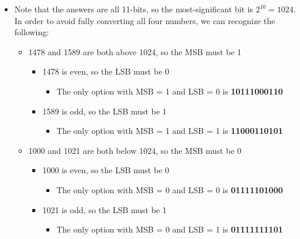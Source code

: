 \begin{itemize}
  \item Note that the answers are all 11-bits, so the most-significant bit is $2^{10} = 1024$. In order to avoid fully converting all four numbers, we can recognize the following:
  \begin{itemize}
    \item 1478 and 1589 are both above 1024, so the MSB must be 1
    \begin{itemize}
      \item 1478 is even, so the LSB must be 0
      \begin{itemize}
        \item The only option with MSB = 1 and LSB = 0 is \textbf{10111000110}
      \end{itemize}
      \item 1589 is odd, so the LSB must be 1
      \begin{itemize}
        \item The only option with MSB = 1 and LSB = 1 is \textbf{11000110101}
      \end{itemize}
    \end{itemize}
    \item 1000 and 1021 are both below 1024, so the MSB must be 0
    \begin{itemize}
      \item 1000 is even, so the LSB must be 0
      \begin{itemize}
        \item The only option with MSB = 0 and LSB = 0 is \textbf{01111101000}
      \end{itemize}
      \item 1021 is odd, so the LSB must be 1
      \begin{itemize}
        \item The only option with MSB = 0 and LSB = 1 is \textbf{01111111101}
      \end{itemize}
    \end{itemize}
  \end{itemize}
\end{itemize}


